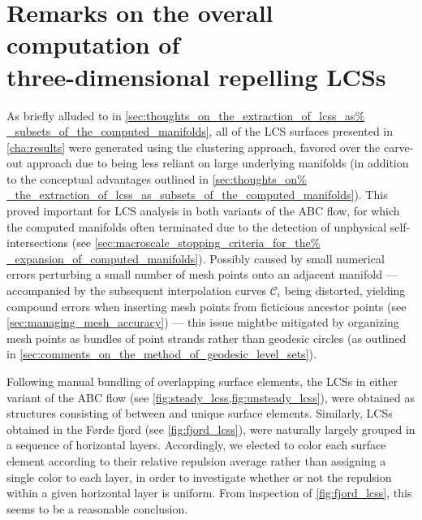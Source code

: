 \section[Remarks on the overall computation of three-dimensional repelling
LCSs]{Remarks on the overall computation of \\\phantom{5.5} three-dimensional
repelling LCSs}
\label{sec:remarks_on_the_overall_computation_of_three_dimensional_repelling_lcss}

As briefly alluded to in \cref{sec:thoughts_on_the_extraction_of_lcss_as%
_subsets_of_the_computed_manifolds}, all of the LCS surfaces presented in
\cref{cha:results} were generated using the clustering approach, favored over
the carve-out approach due to being less reliant on large underlying manifolds
(in addition to the conceptual advantages outlined in \cref{sec:thoughts_on%
_the_extraction_of_lcss_as_subsets_of_the_computed_manifolds}). This proved
important for LCS analysis in both variants of the ABC flow, for which the
computed manifolds often terminated due to the detection of unphysical
self-intersections (see \cref{sec:macroscale_stopping_criteria_for_the%
_expansion_of_computed_manifolds}). Possibly caused by small numerical errors
perturbing a small number of mesh points onto an adjacent manifold ---
accompanied by the subsequent interpolation curves $\mathcal{C}_{i}$ being
distorted, yielding compound errors when inserting mesh points from ficticious
ancestor points (see \cref{sec:managing_mesh_accuracy}) --- this issue mightbe
mitigated by organizing mesh points as bundles of point strands rather than
geodesic circles (as outlined in
\cref{sec:comments_on_the_method_of_geodesic_level_sets}).

Following manual bundling of overlapping surface elements, the LCSs in either
variant of the ABC flow (see \cref{fig:steady_lcss,fig:unsteady_lcss}), were
obtained as structures consisting of between  and 
unique surface elements. Similarly, LCSs obtained in the Førde fjord (see
\cref{fig:fjord_lcss}), were naturally largely grouped in a sequence of
horizontal layers. Accordingly, we elected to color each surface element
according to their relative repulsion average rather than assigning a single
color to each layer, in order to investigate whether or not the repulsion
within a given horizontal layer is uniform. From inspection of
\cref{fig:fjord_lcss}, this seems to be a reasonable conclusion.


